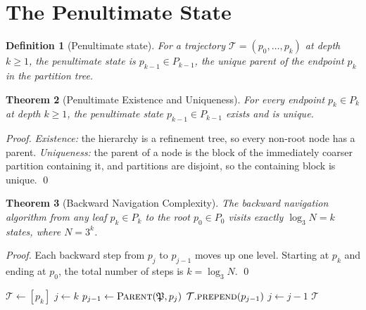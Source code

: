 \documentclass[twocolumn,a4paper]{article}
\newtheorem{theorem}{Theorem}[section]
\newtheorem{definition}[theorem]{Definition}
\newcommand{\PPart}{\mathfrak{P}}
\newcommand{\Trajec}{\mathcal{T}}
\begin{document}
\section{The Penultimate State}
\label{sec:penultimate-state}

\begin{definition}[Penultimate state]
\label{def:penultimate-state}
For a trajectory $\Trajec=(p_{0},\ldots,p_{k})$ at depth $k\geq 1$, the \emph{penultimate state} is $p_{k-1}\in P_{k-1}$, the unique parent of the endpoint $p_{k}$ in the partition tree.
\end{definition}

\begin{theorem}[Penultimate Existence and Uniqueness]
\label{thm:penultimate}
For every endpoint $p_{k}\in P_{k}$ at depth $k\geq 1$, the penultimate state $p_{k-1}\in P_{k-1}$ exists and is unique.
\end{theorem}

\begin{proof}
\emph{Existence:} the hierarchy is a refinement tree, so every non-root node has a parent. \emph{Uniqueness:} the parent of a node is the block of the immediately coarser partition containing it, and partitions are disjoint, so the containing block is unique. \qed
\end{proof}

\begin{theorem}[Backward Navigation Complexity]
\label{thm:backward-complexity}
The backward navigation algorithm from any leaf $p_{k}\in P_{k}$ to the root $p_{0}\in P_{0}$ visits exactly $\log_{3}N=k$ states, where $N=3^{k}$.
\end{theorem}

\begin{proof}
Each backward step from $p_{j}$ to $p_{j-1}$ moves up one level. Starting at $p_{k}$ and ending at $p_{0}$, the total number of steps is $k=\log_{3}N$. \qed
\end{proof}

\begin{algorithm}[!htbp]
\caption{Backward navigation in ternary refinement hierarchy}
\label{alg:backward-nav}
\begin{algorithmic}[1]
\Function{Complete}{$\PPart,p_{k}$}
  \State $\Trajec\gets[p_{k}]$
  \State $j\gets k$
    \State $p_{j-1}\gets\textsc{Parent}(\PPart,p_{j})$
    \State $\Trajec.\textsc{prepend}(p_{j-1})$
    \State $j\gets j-1$
  \EndWhile
  \State \Return $\Trajec$
\EndFunction
\end{algorithmic}
\end{algorithm}
\end{document}
